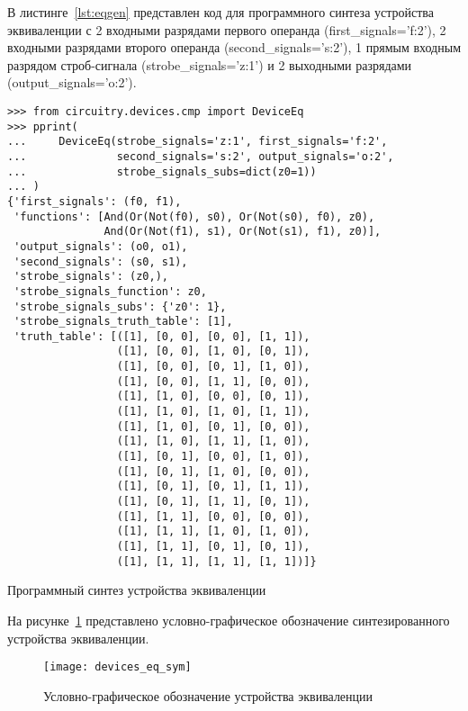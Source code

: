 \documentclass[document.tex]{subfiles}
\begin{document}
\clearpage
В листинге~\ref{lst:eqgen} представлен код для программного синтеза
устройства эквиваленции с 2 входными разрядами первого операнда
(first\_signals='f:2'), 2 входными разрядами второго операнда
(second\_signals='s:2'), 1 прямым входным разрядом строб-сигнала
(strobe\_signals='z:1') и 2 выходными разрядами (output\_signals='o:2').

\begin{listing}[ht]
\begin{verbatim}
>>> from circuitry.devices.cmp import DeviceEq           
>>> pprint(                                                
...     DeviceEq(strobe_signals='z:1', first_signals='f:2',
...              second_signals='s:2', output_signals='o:2',
...              strobe_signals_subs=dict(z0=1))
... )
{'first_signals': (f0, f1),
 'functions': [And(Or(Not(f0), s0), Or(Not(s0), f0), z0),
               And(Or(Not(f1), s1), Or(Not(s1), f1), z0)],
 'output_signals': (o0, o1),
 'second_signals': (s0, s1),
 'strobe_signals': (z0,),
 'strobe_signals_function': z0,
 'strobe_signals_subs': {'z0': 1},
 'strobe_signals_truth_table': [1],
 'truth_table': [([1], [0, 0], [0, 0], [1, 1]),
                 ([1], [0, 0], [1, 0], [0, 1]),
                 ([1], [0, 0], [0, 1], [1, 0]),
                 ([1], [0, 0], [1, 1], [0, 0]),
                 ([1], [1, 0], [0, 0], [0, 1]),
                 ([1], [1, 0], [1, 0], [1, 1]),
                 ([1], [1, 0], [0, 1], [0, 0]),
                 ([1], [1, 0], [1, 1], [1, 0]),
                 ([1], [0, 1], [0, 0], [1, 0]),
                 ([1], [0, 1], [1, 0], [0, 0]),
                 ([1], [0, 1], [0, 1], [1, 1]),
                 ([1], [0, 1], [1, 1], [0, 1]),
                 ([1], [1, 1], [0, 0], [0, 0]),
                 ([1], [1, 1], [1, 0], [1, 0]),
                 ([1], [1, 1], [0, 1], [0, 1]),
                 ([1], [1, 1], [1, 1], [1, 1])]}
\end{verbatim}
\caption{Программный синтез устройства эквиваленции}
\label{lst:eqgen}
\end{listing}

\clearpage

На рисунке~\ref{fig:deviceeq} представлено условно-графическое обозначение
синтезированного устройства эквиваленции.

\begin{figure}[here]
\centering
\texttt{[image: devices\_eq\_sym]}
\caption{Условно-графическое обозначение устройства эквиваленции}
\label{fig:deviceeq}
\end{figure}
\end{document}
